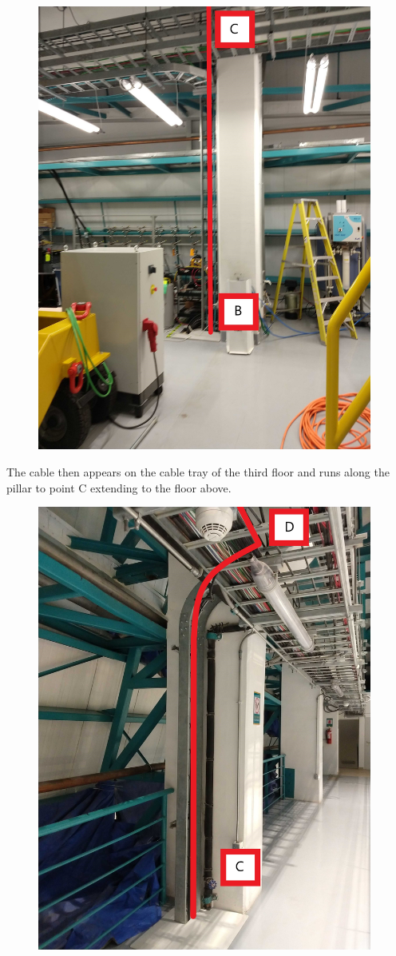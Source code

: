 \begin{figure}
  \includegraphics[width=11cm]{images/13.jpg}
  \centering
  \label{fig:jlsimon}
\end{figure}

The cable then appears on the cable tray of the third floor and runs along the pillar to point C extending to the floor above.

\begin{figure}
  \includegraphics[width=11cm]{images/14.jpg}
  \centering
  \label{fig:jlsimon}
\end{figure}

